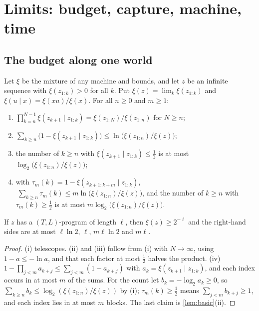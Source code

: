 \section{Limits: budget, capture, machine, time}\label{sec:limits}

\subsection{The budget along one world}

\begin{theorem}[Budget]\label{thm:budget}
Let $\xi$ be the mixture of any machine and bounds, and let $z$ be an infinite sequence with $\xi(z_{1:k})>0$
for all $k$. Put $\xi(z)=\lim_k\xi(z_{1:k})$ and $\xi(u\mid x)=\xi(xu)/\xi(x)$. For all $n\ge0$ and $m\ge1$:
\begin{enumerate}[label=(\roman*),leftmargin=2em,itemsep=1pt,topsep=2pt]
\item $\prod_{k=n}^{N-1}\xi(z_{k+1}\mid z_{1:k})=\xi(z_{1:N})/\xi(z_{1:n})$ for $N\ge n$;
\item $\sum_{k\ge n}\bigl(1-\xi(z_{k+1}\mid z_{1:k})\bigr)\le\ln\bigl(\xi(z_{1:n})/\xi(z)\bigr)$;
\item the number of $k\ge n$ with $\xi(z_{k+1}\mid z_{1:k})\le\frac12$ is at most $\log_2\bigl(\xi(z_{1:n})/\xi(z)\bigr)$;
\item with $\tau_m(k)=1-\xi(z_{k+1:k+m}\mid z_{1:k})$, $\ \sum_{k\ge n}\tau_m(k)\le m\ln\bigl(\xi(z_{1:n})/\xi(z)\bigr)$,
and the number of $k\ge n$ with $\tau_m(k)\ge\frac12$ is at most $m\log_2\bigl(\xi(z_{1:n})/\xi(z)\bigr)$.
\end{enumerate}
If $z$ has a $(T,L)$-program of length $\ell$, then $\xi(z)\ge2^{-\ell}$ and the right-hand sides are at most
$\ell\ln2$, $\ell$, $m\ell\ln2$ and $m\ell$.
\end{theorem}
\begin{proof}
(i) telescopes. (ii) and (iii) follow from (i) with $N\to\infty$, using $1-a\le-\ln a$, and that each factor at
most $\frac12$ halves the product. (iv) $1-\prod_{j<m}a_{k+j}\le\sum_{j<m}(1-a_{k+j})$ with
$a_k=\xi(z_{k+1}\mid z_{1:k})$, and each index occurs in at most $m$ of the sums. For the count let
$b_k=-\log_2a_k\ge0$, so $\sum_{k\ge n}b_k\le\log_2(\xi(z_{1:n})/\xi(z))$ by (i); $\tau_m(k)\ge\frac12$ means
$\sum_{j<m}b_{k+j}\ge1$, and each index lies in at most $m$ blocks. The last claim is
\cref{lem:basic}(ii).
\end{proof}

